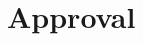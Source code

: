 \section*{Approval}

\vfill

\begin{center}
\namesigdate{\frederik~-~\frederiknumber}
\namesigdate{\marcus~-~\marcusnumber}
\end{center}

\vfill


